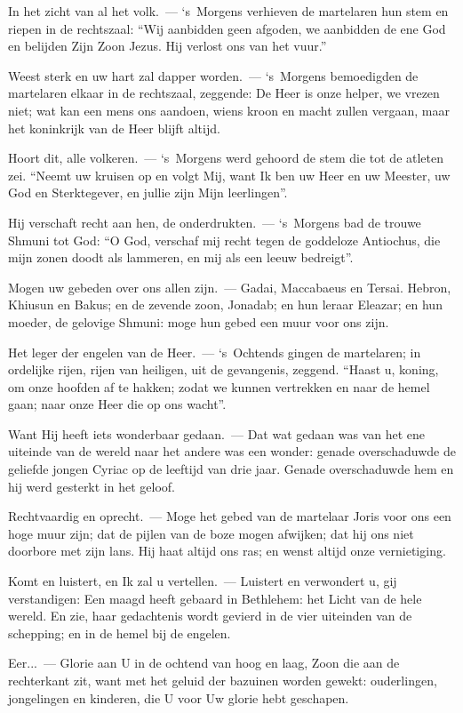 \documentclass[12pt,twoside,a5paper]{article}
\begin{document}
\begin{halfparskip}
  In het zicht van al het volk.~--- `s~Morgens verhieven de martelaren hun stem en riepen in de rechtszaal: ``Wij aanbidden geen afgoden, we aanbidden de ene God en belijden Zijn Zoon Jezus. Hij verlost ons van het vuur.''

  Weest sterk en uw hart zal dapper worden.~--- `s~Morgens bemoedigden de martelaren elkaar in de rechtszaal, zeggende: De Heer is onze helper, we vrezen niet; wat kan een mens ons aandoen, wiens kroon en macht zullen vergaan, maar het koninkrijk van de Heer blijft altijd.

  Hoort dit, alle volkeren.~--- `s~Morgens werd gehoord de stem die tot de atleten zei. ``Neemt uw kruisen op en volgt Mij, want Ik ben uw Heer en uw Meester, uw God en Sterktegever, en jullie zijn Mijn leerlingen''.

  Hij verschaft recht aan hen, de onderdrukten.~--- `s~Morgens bad de trouwe Shmuni tot God: ``O God, verschaf mij recht tegen de goddeloze Antiochus, die mijn zonen doodt als lammeren, en mij als een leeuw bedreigt''.

  Mogen uw gebeden over ons allen zijn.~--- Gadai, Maccabaeus en Tersai. Hebron, Khiusun en Bakus; en de zevende zoon, Jonadab; en hun leraar Eleazar; en hun moeder, de gelovige Shmuni: moge hun gebed een muur voor ons zijn.

  Het leger der engelen van de Heer.~--- `s~Ochtends gingen de martelaren; in ordelijke rijen, rijen van heiligen, uit de gevangenis, zeggend. ``Haast u, koning, om onze hoofden af te hakken; zodat we kunnen vertrekken en naar de hemel gaan; naar onze Heer die op ons wacht''.

  Want Hij heeft iets wonderbaar gedaan.~--- Dat wat gedaan was van het ene uiteinde van de wereld naar het andere was een wonder: genade overschaduwde de geliefde jongen Cyriac op de leeftijd van drie jaar. Genade overschaduwde hem en hij werd gesterkt in het geloof.

  Rechtvaardig en oprecht.~--- Moge het gebed van de martelaar Joris voor ons een hoge muur zijn; dat de pijlen van de boze mogen afwijken; dat hij ons niet doorbore met zijn lans. Hij haat altijd ons ras; en wenst altijd onze vernietiging.

  Komt en luistert, en Ik zal u vertellen.~--- Luistert en verwondert u, gij verstandigen: Een maagd heeft gebaard in Bethlehem: het Licht van de hele wereld. En zie, haar gedachtenis wordt gevierd in de vier uiteinden van de schepping; en in de hemel bij de engelen.

  Eer...~--- Glorie aan U in de ochtend van hoog en laag, Zoon die aan de rechterkant zit, want met het geluid der bazuinen worden gewekt: ouderlingen, jongelingen en kinderen, die U voor Uw glorie hebt geschapen.


\end{halfparskip}
\end{document}
